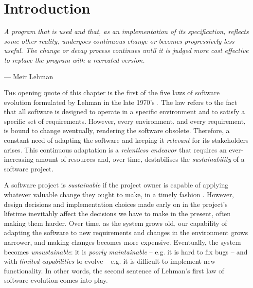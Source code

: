 \chapter{Introduction}\label{chap:introduction}

\epigraph{\emph{A program that is used and that, as an implementation of its specification, reflects some other reality, undergoes continuous change or becomes progressively less useful.
The change or decay process continues until it is judged more cost effective to replace the program with a recreated version.}}{--- Meir Lehman}

\lettrine{T}{he} opening quote of this chapter is the first of the five laws of software evolution formulated by Lehman in the late 1970's \cite{Lehman1979}.
The law refers to the fact that all software is designed to operate in a specific environment and to satisfy a specific set of requirements. 
However, every environment, and every requirement, is bound to change eventually, rendering the software obsolete. %
Therefore, a constant need of adapting the software and keeping it \emph{relevant} for its stakeholders arises.
This continuous adaptation is a \emph{relentless endeavor} that requires an ever-increasing amount of resources and, over time, destabilises the \emph{sustainability} of a software project.

A software project is \emph{sustainable} if the project owner is capable of applying whatever valuable change they ought to make, in a timely fashion \cite{Winters2020}.
However, design decisions and implementation choices made early on in the project's lifetime inevitably affect the decisions we have to make in the present, often making them harder.
Over time, as the system grows old, our capability of adapting the software to new requirements and changes in the environment grows narrower, and making changes becomes more expensive.
Eventually, the system becomes \emph{unsustainable}: it is \emph{poorly maintainable} -- e.g. it is hard to fix bugs -- and with \emph{limited capabilities} to evolve -- e.g. it is difficult to implement new functionality. In other words, the second sentence of Lehman's first law of software evolution comes into play.

